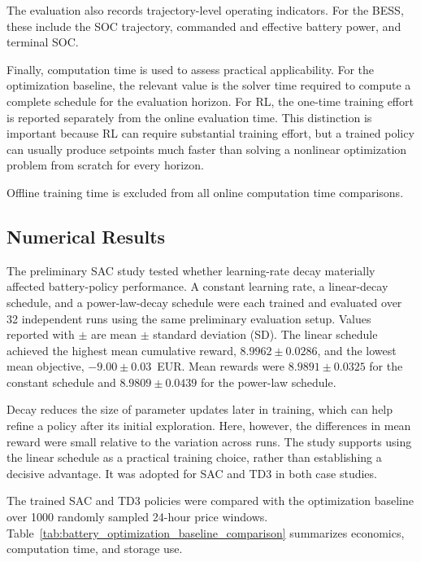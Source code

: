 \documentclass[12pt]{article}
\begin{document}
The evaluation also records trajectory-level operating indicators. For the BESS, these include the SOC trajectory, commanded and effective battery power, and terminal SOC.

Finally, computation time is used to assess practical applicability. For the optimization baseline, the relevant value is the solver time required to compute a complete schedule for the evaluation horizon. For RL, the one-time training effort is reported separately from the online evaluation time. This distinction is important because RL can require substantial training effort, but a trained policy can usually produce setpoints much faster than solving a nonlinear optimization problem from scratch for every horizon.

Offline training time is excluded from all online computation time comparisons.

\FloatBarrier
\subsection{Numerical Results}
\label{sec:battery_results}

The preliminary SAC study tested whether learning-rate decay materially affected battery-policy performance. A constant learning rate, a linear-decay schedule, and a power-law-decay schedule were each trained and evaluated over 32 independent runs using the same preliminary evaluation setup. Values reported with $\pm$ are mean $\pm$ standard deviation (SD). The linear schedule achieved the highest mean cumulative reward, $8.9962 \pm 0.0286$, and the lowest mean objective, $-9.00 \pm 0.03$~EUR. Mean rewards were $8.9891 \pm 0.0325$ for the constant schedule and $8.9809 \pm 0.0439$ for the power-law schedule.

Decay reduces the size of parameter updates later in training, which can help refine a policy after its initial exploration. Here, however, the differences in mean reward were small relative to the variation across runs. The study supports using the linear schedule as a practical training choice, rather than establishing a decisive advantage. It was adopted for SAC and TD3 in both case studies.

The trained SAC and TD3 policies were compared with the optimization baseline over 1000 randomly sampled 24-hour price windows. Table~\ref{tab:battery_optimization_baseline_comparison} summarizes economics, computation time, and storage use.
\end{document}
